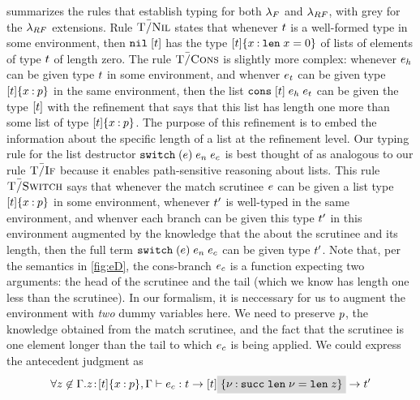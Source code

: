  summarizes
the rules that establish typing for both $\lambda_{F}$ and
$\lambda_{RF}$, with grey %
for the $\lambda_{RF}$ extensions.
%
Rule $\textsc{T\=/Nil}$ states that whenever $t$ is a well-formed
type in some environment, then  $\texttt{nil}\;[{t}]$ has the type
${{[t]}\{x \mathbin{:} \mathtt{len}\; x = 0\}}$ of lists of elements
of type $t$ of length zero.
%
The rule $\textsc{T\=/Cons}$ is slightly more complex: whenever $e_h$
can be given type $t$ in some environment, and whenver
$e_t$ can be given type
${{[t]}\{x \mathbin{:} p\}}$ in the same environment,
then the list $\texttt{cons}\;[{t}]\;{e_h}\;{e_t}$ can be given
the type $[t]$ with the refinement that says that
this list has length one more than some list of type
${{[t]}\{x \mathbin{:} p\}}$.
%
The purpose of this refinement is to embed the information about
the specific length of a list at the refinement level.
%
Our typing rule for the list destructor 
${{\texttt{switch}}}\;({e})\;{e_n}\;{e_c}$ is 
best thought of as analogous to our rule $\textsc{T\=/If}$
because it enables path-sensitive reasoning about lists.
%
This rule $\textsc{T\=/Switch}$ says that whenever the match scrutinee
$e$ can be given a list type 
${{[t]}\{x \mathbin{:} p\}}$ in some environment,
whenever $t'$ is well-typed in the same environment,
and whenver each branch can be given this type
$t'$ in this environment augmented by the knowledge 
that the about the scrutinee and its length, then the full
term ${{\texttt{switch}}}\;({e})\;{e_n}\;{e_c}$ can be given type
$t'$. 
%
Note that, per the semantics in \ref{fig:eD}, the cons-branch
$e_c$ is a function expecting two arguments: the head
of the scrutinee and the tail (which we know has length
one less than the scrutinee).
%
In our formalism, it is neccessary for us to augment the 
environment with \emph{two} dummy variables here. We need
to preserve $p$,
the knowledge obtained from the match scrutinee,
and the fact that the scrutinee is one element longer than
the tail to which $e_c$ is being applied.
%
We could express the antecedent judgment as
\begin{equation}
  \label{badswitch}
\forall\notmem{z}{\tcenv}. 
  \hastype{\bind{z}{\breft{\tlist{\stype}}{x}{p},\tcenv}}
     {\sexpr_c}
     {\funcftype{\stype}{\funcftype{\tlist{\stype}\greybox{\breft{}{\vv}{\suc \len \vv = \len z}}}{\stype'}}}
\end{equation}
